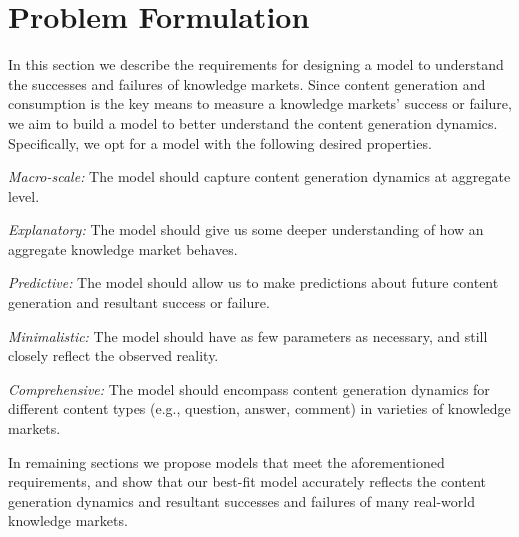 \section{Problem Formulation} 
In this section we describe the requirements for designing a model to understand the successes and failures of knowledge markets. Since content generation and consumption is the key means to measure a knowledge markets' success or failure, we aim to build a model to better understand the content generation dynamics. Specifically, we opt for a model with the following desired properties.


\emph{Macro-scale:} The model should capture content generation dynamics at aggregate level. 

\emph{Explanatory:} The model should give us some deeper understanding of how an aggregate knowledge market behaves.

\emph{Predictive:} The model should allow us to make predictions about future content generation and resultant success or failure.

\emph{Minimalistic:} The model should have as few parameters as necessary, and still closely reflect the observed reality.

\emph{Comprehensive:} The model should encompass content generation dynamics for different content types (e.g., question, answer, comment) in varieties of knowledge markets.

In remaining sections we propose models that meet the aforementioned requirements, and show that our best-fit model accurately reflects the content generation dynamics and resultant successes and failures of many real-world knowledge markets.
